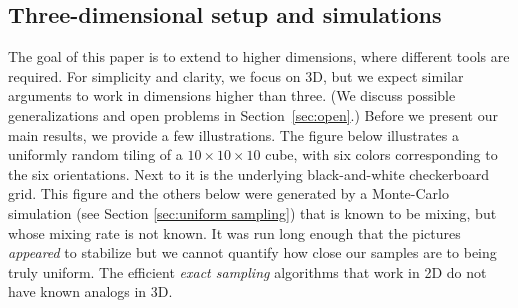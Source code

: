 \documentclass[11pt]{article}
\theoremstyle{remark}
\theoremstyle{definition}
\begin{document}
\subsection{Three-dimensional setup and simulations}
The goal of this paper is to extend \cite{cohn2001variational} to higher dimensions, where different tools are required. For simplicity and clarity, we focus on 3D, but we expect similar arguments to work in dimensions higher than three. (We discuss possible generalizations and open problems in Section~\ref{sec:open}.) Before we present our main results, we provide a few illustrations. The figure below illustrates a uniformly random tiling of a $10 \times 10 \times 10$ cube, with six colors corresponding to the six orientations. Next to it is the underlying black-and-white checkerboard grid. This figure and the others below were generated by a Monte-Carlo simulation (see Section \ref{sec:uniform sampling}) that is known to be mixing, but whose mixing rate is not known. It was run long enough that the pictures {\em appeared} to stabilize but we cannot quantify how close our samples are to being truly uniform. The efficient {\em exact sampling} algorithms that work in 2D do not have known analogs in 3D.
\end{document}
